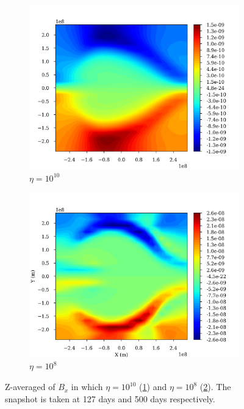 \documentclass[11pt]{article}
\begin{document}
\begin{figure}
\begin{subfigure}{0.49\textwidth}
	\centering
	\includegraphics[width=\linewidth]{images/Bx_XYcut_e10.png}
	\caption{$\eta = 10^{10}$}
	\label{fig:Bx10}
\end{subfigure}
\begin{subfigure}{0.49\textwidth}
	\centering
	\includegraphics[width=\linewidth]{images/bx_05e7_500.png}
	\caption{$\eta = 10^8$}
	\label{fig:Bx8}
\end{subfigure}
\label{fig:Bx}
\caption{Z-averaged of $B_x$ in which $\eta=10^{10}$ (\ref{fig:Bx10}) and $\eta=10^{8}$ (\ref{fig:Bx8}). The snapshot is taken at 127 days and 500 days respectively.}
\end{figure}
\end{document}
